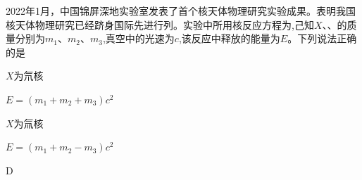 2022年1月，中国锦屏深地实验室发表了首个核天体物理研究实验成果。表明我国核天体物理研究已经跻身国际先进行列。实验中所用核反应方程为,己知\(X\)、、的质量分别为\(m_1\)、\(m_2\)、\(m_3\),真空中的光速为\(c\),该反应中释放的能量为\(E\)。下列说法正确的是\paren[]
\begin{choices}
	\item \(X\)为氘核
	\item \(E = (m_1 + m_2 + m_3)c^2\)
	\item \(X\)为氚核
	\item \(E = (m_1 + m_2 - m_3)c^2\)
\end{choices}
\begin{answer}
	D
\end{answer}
